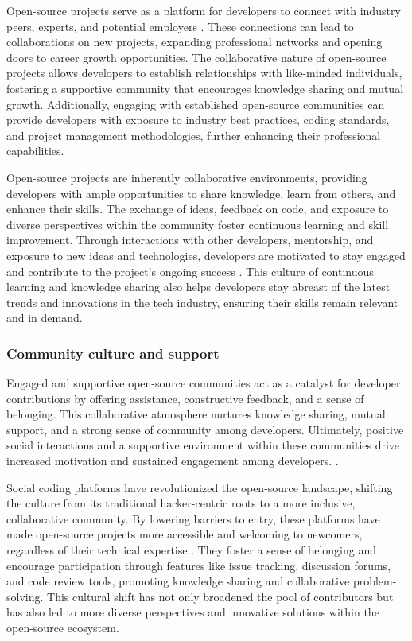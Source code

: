 Open-source projects serve as a platform for developers to connect with industry peers, experts, and potential employers \cite{10wu2007empirical,11gerosa2021shifting,13li2012leadership}. These connections can lead to collaborations on new projects, expanding professional networks and opening doors to career growth opportunities. The collaborative nature of open-source projects allows developers to establish relationships with like-minded individuals, fostering a supportive community that encourages knowledge sharing and mutual growth.  Additionally, engaging with established open-source communities can provide developers with exposure to industry best practices, coding standards, and project management methodologies, further enhancing their professional capabilities.

Open-source projects are inherently collaborative environments, providing developers with ample opportunities to share knowledge, learn from others, and enhance their skills. The exchange of ideas, feedback on code, and exposure to diverse perspectives within the community foster continuous learning and skill improvement. Through interactions with other developers, mentorship, and exposure to new ideas and technologies, developers are motivated to stay engaged and contribute to the project's ongoing success \cite{05bitzer2007intrinsic,06ye2003toward,09lakhani2005hackers,13li2012leadership}. This culture of continuous learning and knowledge sharing also helps developers stay abreast of the latest trends and innovations in the tech industry, ensuring their skills remain relevant and in demand.


\subsubsection{Community culture and support }

Engaged and supportive open-source communities act as a catalyst for developer contributions by offering assistance, constructive feedback, and a sense of belonging. This collaborative atmosphere nurtures knowledge sharing, mutual support, and a strong sense of community among developers. Ultimately, positive social interactions and a supportive environment within these communities drive increased motivation and sustained engagement among developers. \cite{10wu2007empirical,12choi2015characteristics,13li2012leadership,16ke2008motivations}.

Social coding platforms have revolutionized the open-source landscape, shifting the culture from its traditional hacker-centric roots to a more inclusive, collaborative community. By lowering barriers to entry, these platforms have made open-source projects more accessible and welcoming to newcomers, regardless of their technical expertise \cite{06ye2003toward,11gerosa2021shifting}. They foster a sense of belonging and encourage participation through features like issue tracking, discussion forums, and code review tools, promoting knowledge sharing and collaborative problem-solving. This cultural shift has not only broadened the pool of contributors but has also led to more diverse perspectives and innovative solutions within the open-source ecosystem.

